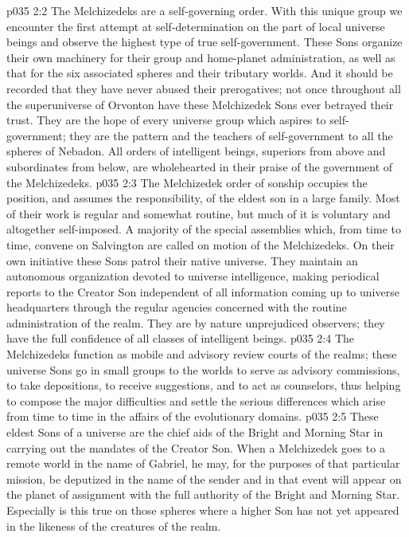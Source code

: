 \vs p035 2:2 The Melchizedeks are a self\hyp{}governing order. With this unique group we encounter the first attempt at self\hyp{}determination on the part of local universe beings and observe the highest type of true self\hyp{}government. These Sons organize their own machinery for their group and home\hyp{}planet administration, as well as that for the six associated spheres and their tributary worlds. And it should be recorded that they have never abused their prerogatives; not once throughout all the superuniverse of Orvonton have these Melchizedek Sons ever betrayed their trust. They are the hope of every universe group which aspires to self\hyp{}government; they are the pattern and the teachers of self\hyp{}government to all the spheres of Nebadon. All orders of intelligent beings, superiors from above and subordinates from below, are wholehearted in their praise of the government of the Melchizedeks.
\pc \vs p035 2:3 The Melchizedek order of sonship occupies the position, and assumes the responsibility, of the eldest son in a large family. Most of their work is regular and somewhat routine, but much of it is voluntary and altogether self\hyp{}imposed. A majority of the special assemblies which, from time to time, convene on Salvington are called on motion of the Melchizedeks. On their own initiative these Sons patrol their native universe. They maintain an autonomous organization devoted to universe intelligence, making periodical reports to the Creator Son independent of all information coming up to universe headquarters through the regular agencies concerned with the routine administration of the realm. They are by nature unprejudiced observers; they have the full confidence of all classes of intelligent beings.
\vs p035 2:4 The Melchizedeks function as mobile and advisory review courts of the realms; these universe Sons go in small groups to the worlds to serve as advisory commissions, to take depositions, to receive suggestions, and to act as counselors, thus helping to compose the major difficulties and settle the serious differences which arise from time to time in the affairs of the evolutionary domains.
\vs p035 2:5 These eldest Sons of a universe are the chief aids of the Bright and Morning Star in carrying out the mandates of the Creator Son. When a Melchizedek goes to a remote world in the name of Gabriel, he may, for the purposes of that particular mission, be deputized in the name of the sender and in that event will appear on the planet of assignment with the full authority of the Bright and Morning Star. Especially is this true on those spheres where a higher Son has not yet appeared in the likeness of the creatures of the realm.
